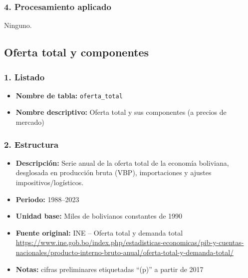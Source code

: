 \documentclass[12pt,a4paper]{article}
\begin{document}
\subsubsection*{4. Procesamiento aplicado}
Ninguno.

\subsection{Oferta total y componentes}

\subsubsection*{1. Listado}
\begin{itemize}
  \item \textbf{Nombre de tabla:} \texttt{oferta\_total}
  \item \textbf{Nombre descriptivo:} Oferta total y sus componentes (a precios de mercado)
\end{itemize}

\subsubsection*{2. Estructura}
\begin{itemize}
  \item \textbf{Descripción:} Serie anual de la oferta total de la economía boliviana, desglosada en producción bruta (VBP), importaciones y ajustes impositivos/logísticos.
  \item \textbf{Periodo:} 1988–2023
  \item \textbf{Unidad base:} Miles de bolivianos constantes de 1990
  \item \textbf{Fuente original:} INE – Oferta total y demanda total\\
        \url{https://www.ine.gob.bo/index.php/estadisticas-economicas/pib-y-cuentas-nacionales/producto-interno-bruto-anual/oferta-total-y-demanda-total/}
  \item \textbf{Notas:} cifras preliminares etiquetadas “(p)” a partir de 2017
\end{itemize}
\end{document}
